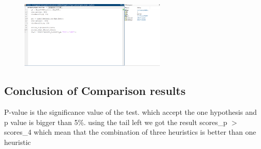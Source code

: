 \documentclass{article}
\begin{document}
\begin{figure}[h!]
\centering
\includegraphics[width=7cm]{ttest2.png}
\label{fig:MyAI4 results}
\end{figure}

\subsection{Conclusion of Comparison results}
P-value is the significance value of the test. which accept the one hypothesis and p value is bigger than 5\%. using the tail left we got the result scores\_p $>$ scores\_4 which mean that the combination of three heuristics is better than one heuristic
\end{document}
